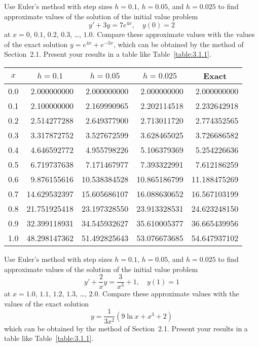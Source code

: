 \documentclass{ximera}
\begin{document}
\begin{problem}\label{exer:3.1.6} 
Use Euler's method with step sizes $h=0.1$, $h=0.05$, and $h=0.025$ to
find approximate values of the solution of the initial value problem
$$
y'+3y=7e^{4x},\quad y(0)=2
$$
at $x=0$, $0.1$, $0.2$, $0.3$, \dots, $1.0$. Compare these approximate values with the values of the exact solution $y=e^{4x}+e^{-3x}$, which can be obtained by the method of Section~2.1. Present your results in a table like Table~\ref{table:3.1.1}.



\begin{solution}
    {\small
\begin{tabular}{|c|r|r|r|r|}\hline
\multicolumn{1}{|c|}{$x$}&
\multicolumn{1}{|c|}{$h=0.1$}&
\multicolumn{1}{|c|}{$h=0.05$}&
\multicolumn{1}{|c|}{$h=0.025$}&
\multicolumn{1}{|c|}{Exact}\\ \hline
0.0 &  2.000000000 &   2.000000000 &  2.000000000 &   2.000000000 \\
0.1 &  2.100000000 &   2.169990965 &  2.202114518 &   2.232642918 \\
0.2 &  2.514277288 &   2.649377900 &  2.713011720 &   2.774352565 \\
0.3 &  3.317872752 &   3.527672599 &  3.628465025 &   3.726686582 \\
0.4 &  4.646592772 &   4.955798226 &  5.106379369 &   5.254226636 \\
0.5 &  6.719737638 &   7.171467977 &  7.393322991 &   7.612186259 \\
0.6 &  9.876155616 &  10.538384528 & 10.865186799 &  11.188475269 \\
0.7 & 14.629532397 &  15.605686107 & 16.088630652 &  16.567103199 \\
0.8 & 21.751925418 &  23.197328550 & 23.913328531 &  24.623248150 \\
0.9 & 32.399118931 &  34.545932627 & 35.610005377 &  36.665439956 \\
1.0 & 48.298147362 &  51.492825643 & 53.076673685 &  54.647937102 \\
\hline
\end{tabular}}
\end{solution}
\end{problem}

\begin{problem}\label{exer:3.1.7} 
Use Euler's method with step sizes $h=0.1$, $h=0.05$, and $h=0.025$ to
find approximate values of the solution of the initial value problem
$$
y'+\frac{2}{x}y=\frac{3}{x^3}+1,\quad y(1)=1
$$
at $x=1.0$, $1.1$, $1.2$, $1.3$, \dots, $2.0$. Compare these approximate values with the values of the exact solution
$$
y=\frac{1}{3x^2}(9\ln x+x^3+2)
$$
which can be obtained by the method of Section~2.1. Present
your results in a table like Table~\ref{table:3.1.1}.
\end{problem}
\end{document}

